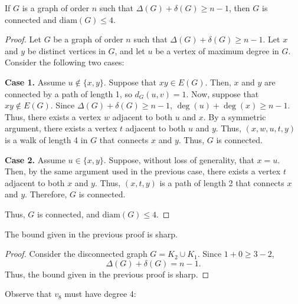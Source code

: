 \documentclass[12pt]{article}
\begin{document}
 If $G$ is a graph of order $n$ such that $\Delta(G) + \delta(G) \geq n - 1$, then $G$ is connected and $\text{diam}(G) \leq 4$.
\begin{proof}
    Let $G$ be a graph of order $n$ such that $\Delta(G) + \delta(G) \geq n - 1$.
    Let $x$ and $y$ be distinct vertices in $G$, and let $u$ be a vertex of maximum degree in $G$.
    Consider the following two cases:

    {\bf Case 1.} Assume $u \notin \{x,y\}$.
    Suppose that $xy \in E(G)$.
    Then, $x$ and $y$ are connected by a path of length 1, so $d_G(u,v) = 1$.
    Now, suppose that $xy \notin E(G)$.
    Since $\Delta(G) + \delta(G) \geq n - 1$, $\deg(u) + \deg(x) \geq n - 1$.
    Thus, there exists a vertex $w$ adjacent to both $u$ and $x$.
    By a symmetric argument, there exists a vertex $t$ adjacent to both $u$ and $y$.
    Thus, $(x, w, u, t, y)$ is a walk of length 4 in $G$ that connects $x$ and $y$.
    Thus, $G$ is connected.

    {\bf Case 2.} Assume $u \in \{x,y\}$.
    Suppose, without loss of generality, that $x = u$.
    Then, by the same argument used in the previous case, there exists a vertex $t$ adjacent to both $x$ and $y$.
    Thus, $(x, t, y)$ is a path of length 2 that connects $x$ and $y$.
    Therefore, $G$ is connected.

    Thus, $G$ is connected, and $\text{diam}(G) \leq 4$.
\end{proof}


 The bound given in the previous proof is sharp.
\begin{proof}
    Consider the disconnected graph $G = K_2 \cup K_1$.
    Since $1 + 0 \geq 3 - 2$, $$\Delta(G) + \delta(G) = n - 1.$$
    Thus, the bound given in the previous proof is sharp.
\end{proof}

\bigskip
{}

Observe that $v_8$ must have degree 4:
\end{document}
